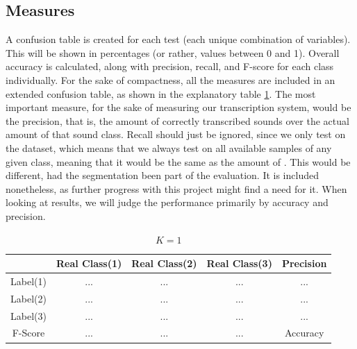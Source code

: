 	\subsection{Measures}
		A confusion table is created for each test (each unique combination of variables). This will be shown in percentages (or rather, values between 0 and 1). Overall accuracy is calculated, along with precision, recall, and F-score for each class individually. For the sake of compactness, all the measures are included in an extended confusion table, as shown in the explanatory table \ref{table:eval:explanatory}. 
		The most important measure, for the sake of measuring our transcription system, would be the precision, that is, the amount of correctly transcribed sounds over the actual amount of that sound class.
		Recall should just be ignored, since we only test on the dataset, which means that we always test on all available samples of any given class, meaning that it would be the same as the amount of . This would be different, had the segmentation been part of the evaluation. It is included nonetheless, as further progress with this project might find a need for it. When looking at results, we will judge the performance primarily by accuracy and precision.

			\begin{table}
				\centering
				\begin{tabular}{|c | c | c | c | c |}
					\hline
				 & Real Class(1) & Real Class(2) & Real Class(3) & Precision\\ \hline
					Label(1)  & ... & ... & ... & ...\\ \hline
					Label(2)  & ... & ... & ... & ...\\ \hline
					Label(3) & ... & ... & ... & ...\\ \hline
					F-Score & ... & ... & ... & Accuracy \\ \cline{1-4}
				\end{tabular}
				\caption{$K=1$}
				\label{table:eval:explanatory}
			\end{table}
		
		
